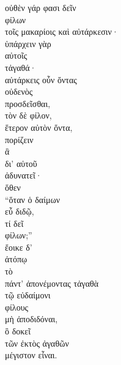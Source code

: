 {\large
\begin{greek}
\noindent  οὐθὲν γάρ φασι δεῖν \\
\tabto{2em} φίλων \\
τοῖς μακαρίοις καὶ αὐτάρκεσιν· \\
ὑπάρχειν γὰρ \\
\tabto{2em} αὐτοῖς \\
τἀγαθά· \\
αὐτάρκεις οὖν ὄντας \\
\tabto{2em} οὐδενὸς \\
προσδεῖσθαι, \\
τὸν δὲ φίλον, \\
\tabto{2em} ἕτερον αὐτὸν ὄντα, \\
πορίζειν \\
\tabto{2em} ἃ \\
\tabto{4em} δι' αὑτοῦ \\
\tabto{2em} ἀδυνατεῖ· \\
ὅθεν \\
\tabto{2em} ``ὅταν ὁ δαίμων \\
\tabto{2em} εὖ διδῷ, \\
\tabto{2em} τί δεῖ \\
\tabto{4em} φίλων;'' \\
ἔοικε δ' \\
\tabto{2em} ἀτόπῳ \\
τὸ \\
\tabto{2em} πάντ' ἀπονέμοντας τἀγαθὰ \\
\tabto{4em} τῷ εὐδαίμονι \\
\tabto{2em} φίλους \\
\tabto{2em} μὴ ἀποδιδόναι, \\
ὃ δοκεῖ \\
\tabto{2em} τῶν ἐκτὸς ἀγαθῶν \\
μέγιστον εἶναι.\\

\end{greek}
}

